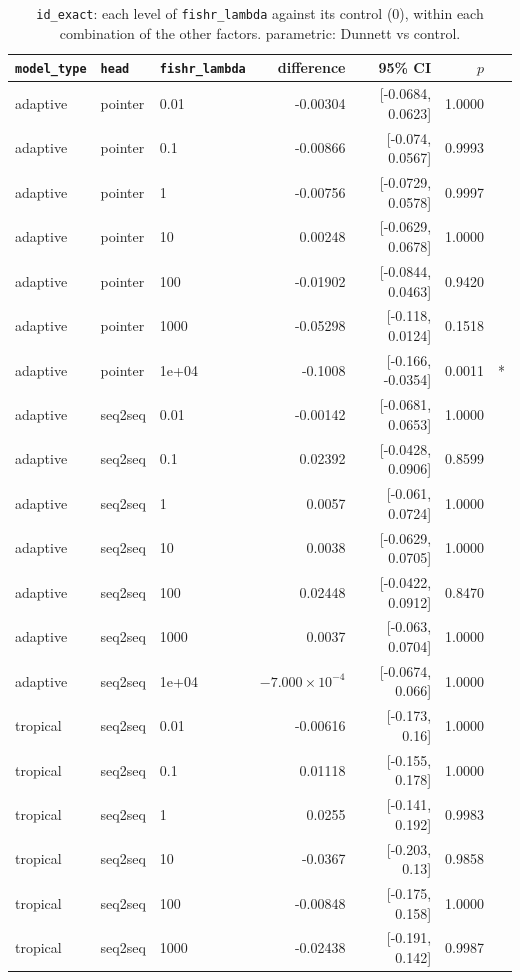 \documentclass[10pt]{article}
\begin{document}
{\small
\begin{longtable}{lllrrrl}
\caption{\texttt{id\_exact}: each level of \texttt{fishr\_lambda} against its control (0), within each combination of the other factors. parametric: Dunnett vs control.}\label{tab:control-id_exact}\\
\toprule
\texttt{model\_type} & \texttt{head} & \texttt{fishr\_lambda} & difference & 95\% CI & $p$ & \\
\midrule
\endhead
adaptive & pointer & 0.01 & -0.00304 & [-0.0684, 0.0623] & 1.0000 & \\
adaptive & pointer & 0.1 & -0.00866 & [-0.074, 0.0567] & 0.9993 & \\
adaptive & pointer & 1 & -0.00756 & [-0.0729, 0.0578] & 0.9997 & \\
adaptive & pointer & 10 & 0.00248 & [-0.0629, 0.0678] & 1.0000 & \\
adaptive & pointer & 100 & -0.01902 & [-0.0844, 0.0463] & 0.9420 & \\
adaptive & pointer & 1000 & -0.05298 & [-0.118, 0.0124] & 0.1518 & \\
adaptive & pointer & 1e+04 & -0.1008 & [-0.166, -0.0354] & 0.0011 & *\\
adaptive & seq2seq & 0.01 & -0.00142 & [-0.0681, 0.0653] & 1.0000 & \\
adaptive & seq2seq & 0.1 & 0.02392 & [-0.0428, 0.0906] & 0.8599 & \\
adaptive & seq2seq & 1 & 0.0057 & [-0.061, 0.0724] & 1.0000 & \\
adaptive & seq2seq & 10 & 0.0038 & [-0.0629, 0.0705] & 1.0000 & \\
adaptive & seq2seq & 100 & 0.02448 & [-0.0422, 0.0912] & 0.8470 & \\
adaptive & seq2seq & 1000 & 0.0037 & [-0.063, 0.0704] & 1.0000 & \\
adaptive & seq2seq & 1e+04 & $-7.000\times10^{-4}$ & [-0.0674, 0.066] & 1.0000 & \\
tropical & seq2seq & 0.01 & -0.00616 & [-0.173, 0.16] & 1.0000 & \\
tropical & seq2seq & 0.1 & 0.01118 & [-0.155, 0.178] & 1.0000 & \\
tropical & seq2seq & 1 & 0.0255 & [-0.141, 0.192] & 0.9983 & \\
tropical & seq2seq & 10 & -0.0367 & [-0.203, 0.13] & 0.9858 & \\
tropical & seq2seq & 100 & -0.00848 & [-0.175, 0.158] & 1.0000 & \\
tropical & seq2seq & 1000 & -0.02438 & [-0.191, 0.142] & 0.9987 & \\

\end{longtable}}
\end{document}
